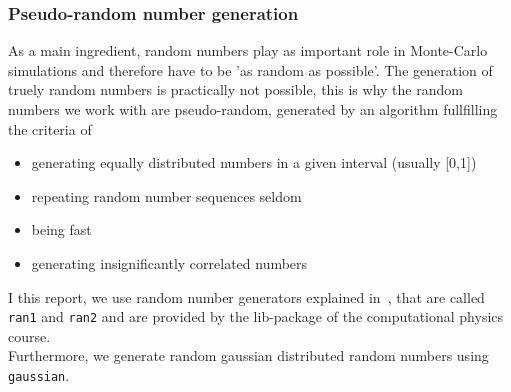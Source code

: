 \subsubsection{Pseudo-random number generation}\label{sec:ran}
As a main ingredient, random numbers play as important role in Monte-Carlo simulations and therefore have to be 'as random as possible'. The generation of truely random numbers is practically not possible, this is why the random numbers we work with are pseudo-random, generated by an algorithm fullfilling the criteria of
\begin{itemize}
\item generating equally distributed numbers in a given interval (usually [0,1])
\item repeating random number sequences seldom
\item being fast
\item generating insignificantly correlated numbers
\end{itemize}
I this report, we use random number generators explained in~\cite{numerical}, that are called \texttt{ran1} and \texttt{ran2} and are provided by the lib-package of the computational physics course.\\
Furthermore, we generate random gaussian distributed random numbers using \texttt{gaussian}. 
